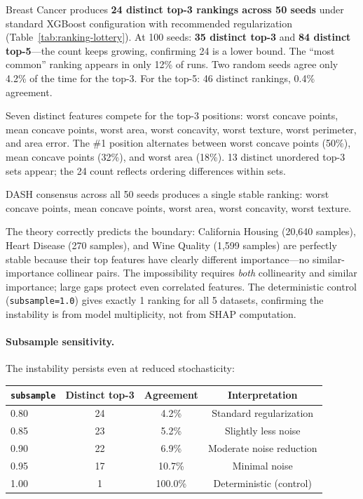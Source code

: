 \documentclass{article}
\begin{document}
Breast Cancer produces \textbf{24 distinct top-3 rankings across 50 seeds} under standard XGBoost configuration with recommended regularization (Table~\ref{tab:ranking-lottery}). At 100 seeds: \textbf{35 distinct top-3} and \textbf{84 distinct top-5}---the count keeps growing, confirming 24 is a lower bound. The ``most common'' ranking appears in only 12\% of runs. Two random seeds agree only 4.2\% of the time for the top-3. For the top-5: 46 distinct rankings, 0.4\% agreement.

Seven distinct features compete for the top-3 positions: worst concave points, mean concave points, worst area, worst concavity, worst texture, worst perimeter, and area error. The \#1 position alternates between worst concave points (50\%), mean concave points (32\%), and worst area (18\%). 13 distinct unordered top-3 sets appear; the 24 count reflects ordering differences within sets.

DASH consensus across all 50 seeds produces a single stable ranking: worst concave points, mean concave points, worst area, worst concavity, worst texture.

The theory correctly predicts the boundary: California Housing (20,640 samples), Heart Disease (270 samples), and Wine Quality (1,599 samples) are perfectly stable because their top features have clearly different importance---no similar-importance collinear pairs. The impossibility requires \emph{both} collinearity and similar importance; large gaps protect even correlated features. The deterministic control (\texttt{subsample=1.0}) gives exactly 1 ranking for all 5 datasets, confirming the instability is from model multiplicity, not from SHAP computation.

\paragraph{Subsample sensitivity.}
The instability persists even at reduced stochasticity:

\begin{center}
\small
\begin{tabular}{@{}lccc@{}}
\toprule
\texttt{subsample} & Distinct top-3 & Agreement & Interpretation \\
\midrule
0.80 & 24 & 4.2\% & Standard regularization \\
0.85 & 23 & 5.2\% & Slightly less noise \\
0.90 & 22 & 6.9\% & Moderate noise reduction \\
0.95 & 17 & 10.7\% & Minimal noise \\
1.00 & 1 & 100.0\% & Deterministic (control) \\
\bottomrule
\end{tabular}
\end{center}
\end{document}
